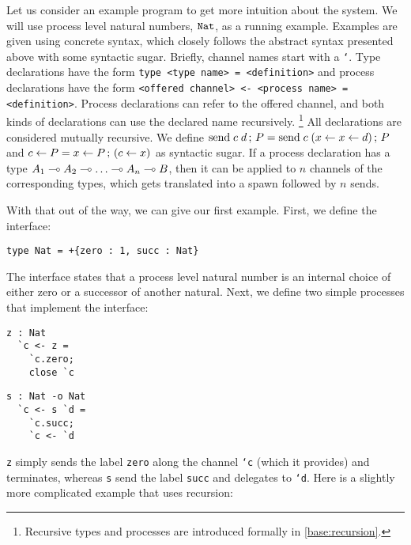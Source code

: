 Let us consider an example program to get more intuition about the system. We will use process level natural numbers, $\mathtt{Nat}$, as a running example. Examples are given using concrete syntax, which closely follows the abstract syntax presented above with some syntactic sugar. Briefly, channel names start with a \texttt{`}. Type declarations have the form \texttt{type <type name> = <definition>} and process declarations have the form \texttt{<offered channel> <- <process name> = <definition>}. Process declarations can refer to the offered channel, and both kinds of declarations can use the declared name recursively.%
\footnote{Recursive types and processes are introduced formally in \cref{base:recursion}.}
All declarations are considered mutually recursive. We define $\mathrm{send}\; c \; {d} \,;\, P = \mathrm{send}\; c \; (x \leftarrow x \leftarrow d) \,;\, P$ and $c \leftarrow P = x \leftarrow P \,;\, (c \leftarrow x)$ as syntactic sugar. If a process declaration has a type $A_1 \multimap A_2 \multimap \ldots \multimap A_n \multimap B$, then it can be applied to $n$ channels of the corresponding types, which gets translated into a spawn followed by $n$ sends.

With that out of the way, we can give our first example. First, we define the interface:

\begin{lstlisting}[language=krill, style=custom]
  type Nat = +{zero : 1, succ : Nat}
\end{lstlisting}

The interface states that a process level natural number is an internal choice of either zero or a successor of another natural. Next, we define two simple processes that implement the interface:

\begin{minipage}{.48\textwidth}
\begin{lstlisting}[language=krill, style=custom]
  z : Nat
  `c <- z =
    `c.zero;
    close `c
\end{lstlisting}
\end{minipage}
\hfill
\begin{minipage}{.48\textwidth}
\begin{lstlisting}[language=krill, style=custom]
  s : Nat -o Nat
  `c <- s `d =
    `c.succ;
    `c <- `d
\end{lstlisting}
\end{minipage}

\texttt{z} simply sends the label \texttt{zero} along the channel \texttt{`c} (which it provides) and terminates, whereas \texttt{s} send the label \texttt{succ} and delegates to \texttt{`d}. Here is a slightly more complicated example that uses recursion:

